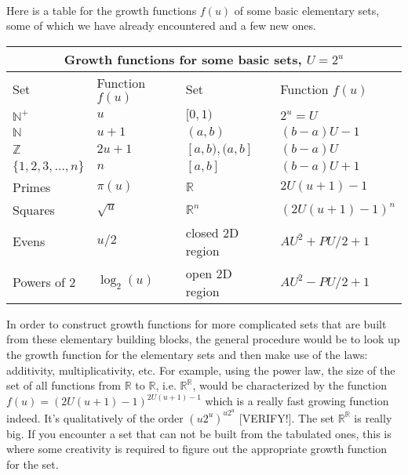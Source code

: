 \documentclass[12pt]{article}
\begin{document}
\paragraph{}
Here is a table for the growth functions $f(u)$ of some basic elementary sets, some of which we have already encountered and a few new ones.
\begin{center}
\begin{tabular}{ |p{3cm}|p{3cm}||p{3cm}|p{3cm}|  }
	\hline
	\multicolumn{4}{|c|}{Growth functions for some basic sets, $U = 2^u$} \\
	\hline
	Set & Function $f(u)$ & Set & Function $f(u)$  \\
	\hline
	$\mathbb{N}^+$         & $u$         & $[0,1)$          & $2^u = U$             \\
	$\mathbb{N}$           & $u+1$       & $(a,b)$          & $(b-a) U - 1$         \\
	$\mathbb{Z}$           & $2 u+1$     & $[a,b),(a,b]$    & $(b-a) U$             \\
	$\{1,2,3, \ldots, n\}$ & $n$         & $[a,b]$          & $(b-a) U + 1$         \\ 
	Primes                 & $\pi(u)$    & $\mathbb{R}$     & $2 U (u+1) - 1$       \\
	Squares                & $\sqrt{u}$  & $\mathbb{R}^n$   & $(2 U (u+1) - 1)^n $  \\
	Evens                  & $u/2$       & closed 2D region & $A U^2 + PU/2 + 1$    \\
	Powers of 2            & $\log_2(u)$ & open 2D region   & $A U^2 - PU/2 + 1$    \\	
	\hline
\end{tabular}
\end{center}
In order to construct growth functions for more complicated sets that are built from these elementary building blocks, the general procedure would be to look up the growth function for the elementary sets and then make use of the laws: additivity, multiplicativity, etc. For example, using the power law, the size of the set of all functions from $\mathbb{R}$ to $\mathbb{R}$, i.e. $\mathbb{R}^{\mathbb{R}}$, would be characterized by the function $f(u) = (2 U (u+1) - 1)^{2 U (u+1) - 1}$ which is a really fast growing function indeed. It's qualitatively of the order $(u 2^u)^{u 2^u}$ [VERIFY!]. The set $\mathbb{R}^{\mathbb{R}}$ is really big. If you encounter a set that can not be built from the tabulated ones, this is where some creativity is required to figure out the appropriate growth function for the set.
\end{document}
